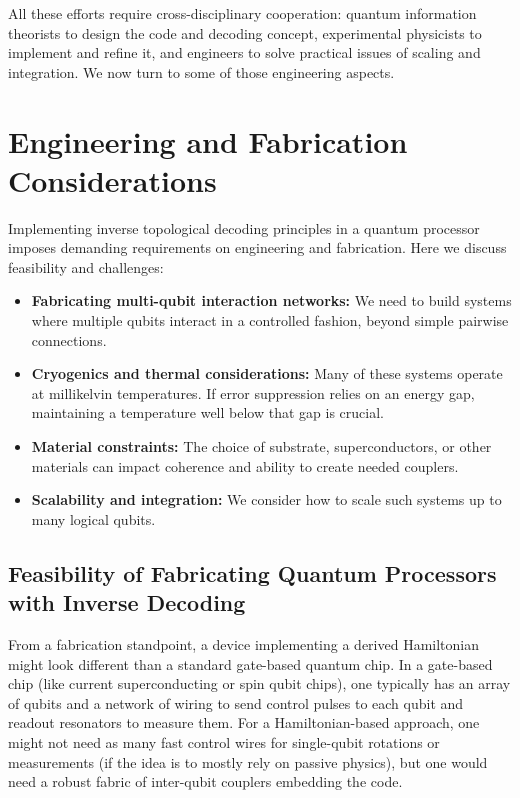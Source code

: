\documentclass[11pt]{article}
\begin{document}
All these efforts require cross-disciplinary cooperation: quantum information theorists to design the code and decoding concept, experimental physicists to implement and refine it, and engineers to solve practical issues of scaling and integration. We now turn to some of those engineering aspects.

\section{Engineering and Fabrication Considerations}
Implementing inverse topological decoding principles in a quantum processor imposes demanding requirements on engineering and fabrication. Here we discuss feasibility and challenges:
\begin{itemize}
    \item \textbf{Fabricating multi-qubit interaction networks:} We need to build systems where multiple qubits interact in a controlled fashion, beyond simple pairwise connections.
    \item \textbf{Cryogenics and thermal considerations:} Many of these systems operate at millikelvin temperatures. If error suppression relies on an energy gap, maintaining a temperature well below that gap is crucial.
    \item \textbf{Material constraints:} The choice of substrate, superconductors, or other materials can impact coherence and ability to create needed couplers.
    \item \textbf{Scalability and integration:} We consider how to scale such systems up to many logical qubits.
\end{itemize}

\subsection{Feasibility of Fabricating Quantum Processors with Inverse Decoding}
From a fabrication standpoint, a device implementing a derived Hamiltonian might look different than a standard gate-based quantum chip. In a gate-based chip (like current superconducting or spin qubit chips), one typically has an array of qubits and a network of wiring to send control pulses to each qubit and readout resonators to measure them. For a Hamiltonian-based approach, one might not need as many fast control wires for single-qubit rotations or measurements (if the idea is to mostly rely on passive physics), but one would need a robust fabric of inter-qubit couplers embedding the code. 
\end{document}
